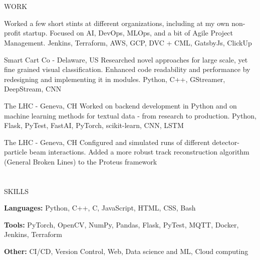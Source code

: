 \documentclass{my_cv}
\begin{document}
\begin{multicols}{2}
\section{\faPencil}{WORK}
    
%
    {}%
    {Worked a few short stints at different organizations, including at my own non-profit startup. Focused on AI, DevOps, MLOps, and a bit of Agile Project Management.}
    {Jenkins, Terraform, AWS, GCP, DVC + CML, GatsbyJs, ClickUp}

%
    {Smart Cart Co - Delaware, US}%
    {Researched novel approaches for large scale, yet fine grained visual classification. Enhanced code readability and performance by redesigning and implementing it in modules.}%
    {Python, C++, GStreamer, DeepStream, CNN}
     
%
    {The LHC - Geneva, CH}%
    {Worked on backend development in Python and on machine learning methods for textual data - from research to production.}%
    {Python, Flask, PyTest, FastAI, PyTorch, scikit-learn, CNN, LSTM}
    
%
    {The LHC - Geneva, CH}%
    {Configured and simulated runs of different detector-particle beam interactions. Added a more robust track reconstruction algorithm (General Broken Lines) to the Proteus framework}{}%
    
\section{\faList}{SKILLS}

\textbf{Languages:} Python, C++, C, JavaScript, HTML, CSS, Bash

\noindent\textbf{Tools:} PyTorch, OpenCV, NumPy, Pandas, Flask, PyTest, MQTT, Docker, Jenkins, Terraform

\noindent\textbf{Other:} CI/CD, Version Control, Web, Data science and ML, Cloud computing

\columnbreak


\end{multicols}
\end{document}
